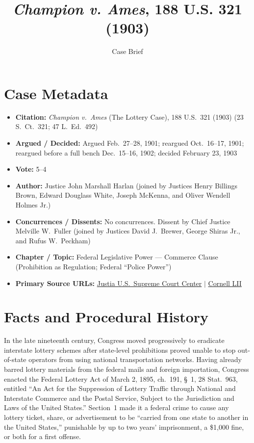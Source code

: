 \documentclass[12pt]{article}
\title{\textit{Champion v. Ames}, 188 U.S. 321 (1903)}
\author{Case Brief}
\date{}
\begin{document}
\maketitle

\section{Case Metadata}
\begin{itemize}
  \item \textbf{Citation:} \textit{Champion v.\ Ames} (The Lottery Case), 188 U.S.\ 321 (1903) (23 S.\ Ct.\ 321; 47 L.\ Ed.\ 492)
  \item \textbf{Argued / Decided:} Argued Feb.\ 27--28, 1901; reargued Oct.\ 16--17, 1901; reargued before a full bench Dec.\ 15--16, 1902; decided February 23, 1903
  \item \textbf{Vote:} 5--4
  \item \textbf{Author:} Justice John Marshall Harlan (joined by Justices Henry Billings Brown, Edward Douglass White, Joseph McKenna, and Oliver Wendell Holmes Jr.)
  \item \textbf{Concurrences / Dissents:} No concurrences. Dissent by Chief Justice Melville W.\ Fuller (joined by Justices David J.\ Brewer, George Shiras Jr., and Rufus W.\ Peckham)
  \item \textbf{Chapter / Topic:} Federal Legislative Power --- Commerce Clause (Prohibition as Regulation; Federal ``Police Power'')
  \item \textbf{Primary Source URLs:} \href{https://supreme.justia.com/cases/federal/us/188/321/}{Justia U.S.\ Supreme Court Center} $|$ \href{https://www.law.cornell.edu/supremecourt/text/188/321}{Cornell LII}
\end{itemize}

\section{Facts and Procedural History}
In the late nineteenth century, Congress moved progressively to eradicate interstate lottery schemes after state-level prohibitions proved unable to stop out-of-state operators from using national transportation networks. Having already barred lottery materials from the federal mails and foreign importation, Congress enacted the Federal Lottery Act of March 2, 1895, ch.\ 191, \S~1, 28 Stat.\ 963, entitled ``An Act for the Suppression of Lottery Traffic through National and Interstate Commerce and the Postal Service, Subject to the Jurisdiction and Laws of the United States.'' Section~1 made it a federal crime to cause any lottery ticket, share, or advertisement to be ``carried from one state to another in the United States,'' punishable by up to two years' imprisonment, a \$1,000 fine, or both for a first offense.
\end{document}
